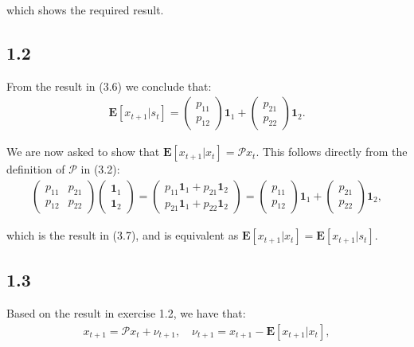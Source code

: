 \documentclass[11pt,a4paper,oneside]{article}
\newcommand{\rb}{\right]}
\newcommand{\lb}{\left[}
\newcommand{\ee}{\mathbf{E}}
\newcommand{\pp}{\mathcal{P}}
\newcommand{\ii}{\mathbf{1}}
\begin{document}
which shows the required result.

\subsection{1.2}
From the result in (3.6) we conclude that:
\begin{align}
    \ee\lb x_{t+1} \vert s_t \rb 
    = 
        \begin{pmatrix} 
            p_{11} \\ p_{12}
        \end{pmatrix}
        \ii_1
        +
        \begin{pmatrix}
            p_{21} \\
            p_{22}
        \end{pmatrix}
        \ii_2.
\end{align}

We are now asked to show that $\ee\lb x_{t+1} \vert x_t\rb = \pp x_t$. This follows directly from the definition of $\pp$ in (3.2):
\begin{align}
    \begin{pmatrix}
        p_{11} & p_{21}\\
        p_{12} & p_{22}
    \end{pmatrix}
    \begin{pmatrix}
        \ii_1 \\
        \ii_2
    \end{pmatrix}
    = 
    \begin{pmatrix} 
        p_{11} \ii_1 + p_{21} \ii_2 \\
        p_{21} \ii_1 + p_{22} \ii_2
    \end{pmatrix}
    = 
    \begin{pmatrix} p_{11}  \\  p_{12}  \end{pmatrix} \ii_1
    +
    \begin{pmatrix} p_{21}  \\  p_{22}  \end{pmatrix}   \ii_2,
\end{align}

which is the result in (3.7), and is equivalent as $\ee\lb x_{t+1} \vert x_t \rb = \ee\lb x_{t+1} \vert s_t\rb$.

\subsection{1.3}
Based on the result in exercise 1.2, we have that:
\begin{align}
    x_{t+1} = \pp x_t + \nu_{t+1}, \quad \nu_{t+1} = x_{t+1} - \ee\lb x_{t+1}\vert x_t\rb,
\end{align}
\end{document}

